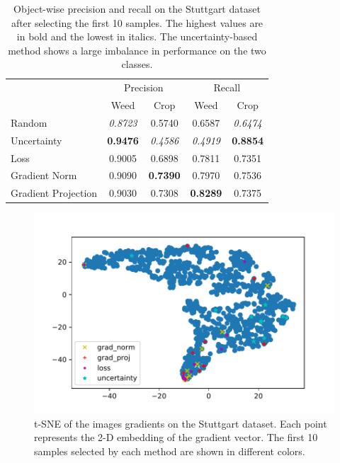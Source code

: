    
       \begin{table}
        \centering
        \caption{Object-wise precision and recall on the Stuttgart dataset after selecting the first 10 samples. The highest values are in bold and the lowest in italics. The uncertainty-based method shows a large imbalance in performance on the two classes.}
        \begin{tabular}{@{}lcccc@{}} 
            \toprule
            & \multicolumn{2}{c}{Precision} & \multicolumn{2}{c}{Recall}\\ 
           \cmidrule{2-5} 
               & Weed & Crop & Weed & Crop \\ 
            \midrule 
    		  Random & \textit{0.8723} & 0.5740 & 0.6587 & \textit{0.6474}  \\ \addlinespace
    		  Uncertainty & \textbf{0.9476} & \textit{0.4586} & \textit{0.4919} & \textbf{0.8854}  \\ \addlinespace
    		  Loss & 0.9005 & 0.6898 & 0.7811 & 0.7351  \\ \addlinespace
    		  Gradient Norm & 0.9090 & \textbf{0.7390} & 0.7970 & 0.7536  \\ \addlinespace
    		  Gradient Projection & 0.9030 & 0.7308 & \textbf{0.8289} & 0.7375  \\ 
            \bottomrule
        \end{tabular}
        \label{tab:object_wise_10_stuttgart}
    \end{table}
   

    
                   \begin{figure}
    \centering
    \includegraphics[width=\linewidth]{pics/tsne_all.pdf}
   		\caption{t-SNE of the images gradients on the Stuttgart dataset. Each point represents the 2-D embedding of the gradient vector. The first 10 samples selected by each method are shown in different colors.}
		\label{fig:tsne}    		
   \end{figure}
    
